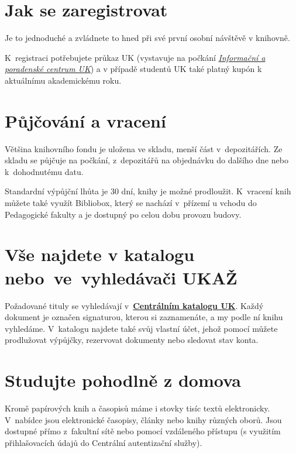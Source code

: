 

\newcommand\ikonka[1]{\bigskip\bgroup\Large #1\egroup\par}
\ikonka{\faPencil}
\section{Jak se zaregistrovat }

Je to jednoduché a zvládnete to hned při své první osobní návštěvě v knihovně.

K~registraci  potřebujete
  průkaz UK (vystavuje na počkání
  \href{http://www.cuni.cz/UK-3249.html}{\emph{Informační a poradenské
  centrum UK}}) a v případě studentů UK také platný kupón k aktuálnímu akademickému
roku.

\ikonka{\faBook}
\section{Půjčování a vracení}

Většina knihovního fondu je uložena ve skladu, menší část
v~depozitářích. Ze skladu se půjčuje na počkání, z~depozitářů na
objednávku do dalšího dne nebo k~dohodnutému datu.


Standardní výpůjční lhůta je 30 dní, knihy je možné prodloužit.
K~vracení knih můžete také využít Bibliobox, který se nachází v~přízemí
u vchodu do Pedagogické fakulty a je dostupný po celou dobu provozu
budovy.

\ikonka{\faSearch}
\section{Vše najdete v katalogu nebo~ve~vyhledávači UKAŽ}

Požadované tituly se vyhledávají v~\href{http://ckis.cuni.cz/}{\textbf{Centrálním katalogu UK}}. Každý
dokument je označen signaturou, kterou si zaznamenáte,
a my podle ní knihu vyhledáme. V~katalogu najdete také svůj vlastní
účet, jehož pomocí můžete prodlužovat výpůjčky, rezervovat dokumenty nebo
sledovat stav konta.

\ikonka{\faBed}
\section{Studujte pohodlně z domova}
Kromě papírových knih a časopisů máme i
stovky tisíc textů elektronicky.  V~nabídce jsou elektronické
časopisy, články nebo knihy různých oborů. Jsou dostupné přímo
z~fakultní sítě nebo pomocí vzdáleného přístupu (s využitím
přihlašovacích údajů do Centrální autentizační služby).

